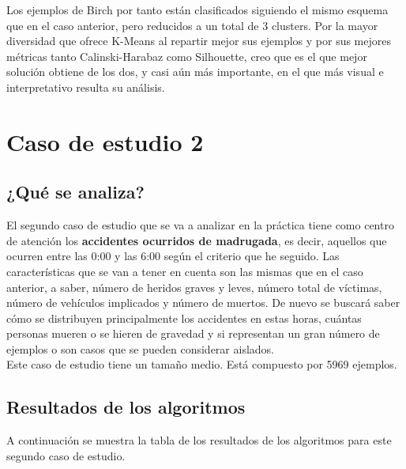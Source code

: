 	Los ejemplos de Birch por tanto están clasificados siguiendo el mismo esquema que en el caso anterior, pero reducidos a un total de 3 clusters. Por la mayor diversidad que ofrece K-Means al repartir mejor sus ejemplos y por sus mejores métricas tanto Calinski-Harabaz como Silhouette, creo que es el que mejor solución obtiene de los dos, y casi aún más importante, en el que más visual e interpretativo resulta su análisis.
	
	\section{Caso de estudio 2}
	
	\subsection{¿Qué se analiza?}
	El segundo caso de estudio que se va a analizar en la práctica tiene como centro de atención los \textbf{accidentes ocurridos de madrugada}, es decir, aquellos que ocurren entre las 0:00 y las 6:00 según el criterio que he seguido. Las características que se van a tener en cuenta son las mismas que en el caso anterior, a saber, número de heridos graves y leves, número total de víctimas, número de vehículos implicados y número de muertos. De nuevo se buscará saber cómo se distribuyen principalmente los accidentes en estas horas, cuántas personas mueren o se hieren de gravedad y si representan un gran número de ejemplos o son casos que se pueden considerar aislados.\\
	
	Este caso de estudio tiene un tamaño medio. Está compuesto por 5969 ejemplos.
	
	\subsection{Resultados de los algoritmos}
	
	A continuación se muestra la tabla de los resultados de los algoritmos para este segundo caso de estudio.
	
